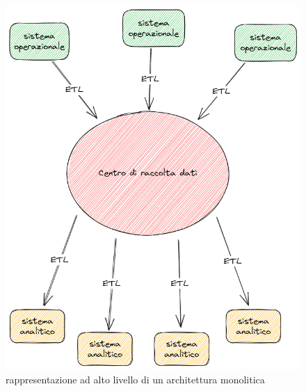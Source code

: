 \documentclass[a4paper,12pt]{report}
\begin{document}
\begin{figure}[h]
\centering
\includegraphics[scale = 0.4]{immagini/vista architetture centralizzate 2023-07-21 11.27.28.excalidraw.png}
\caption{rappresentazione ad alto livello di un architettura monolitica}
\label{fig:architettura monolitica}
\end{figure}
\end{document}
